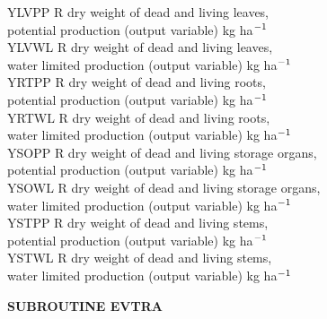 \begin{tabbing}
YLVPP\> \> R\> dry weight of dead and living leaves, \\
\>\> \> potential production (output variable)\> \> \> \> \> \> \> kg ha$^{{\rm -1}}$\\
YLVWL\> \> R\> dry weight of dead and living leaves, \\
\>\> \> water limited production (output variable)\> \> \> \> \> \> \> kg ha$^{{\rm -1}}$\\
YRTPP\> \> R\> dry weight of dead and living roots, \\
\>\> \> potential production (output variable)\> \> \> \> \> \> \> kg ha$^{{\rm -1}}$\\
YRTWL\> \> R\> dry weight of dead and living roots, \\
\>\> \> water limited production (output variable)\> \> \> \> \> \> \> kg ha$^{{\rm -1}}$\\
YSOPP\> \> R\> dry weight of dead and living storage organs,\\
\>\> \> potential production (output variable)\> \> \> \> \> \> \> kg ha$^{{\rm -1}}$\\
YSOWL\> \> R\> dry weight of dead and living storage organs, \\
\>\> \> water limited production (output variable)\> \> \> \> \> \> \> kg ha$^{{\rm -1}}$\\
YSTPP\> \> R\> dry weight of dead and living stems,\\
\>\> \> potential production (output variable)\> \> \> \> \> \> \> kg ha$^{{\rm -1}}$\\
YSTWL\> \> R\> dry weight of dead and living stems, \\
\>\> \> water limited production (output variable)\> \> \> \> \> \> \> kg ha$^{{\rm -1}}$
\end{tabbing}

\bigskip
\bigskip
\bigskip
\bigskip
{\bf SUBROUTINE EVTRA}
\testlastline

